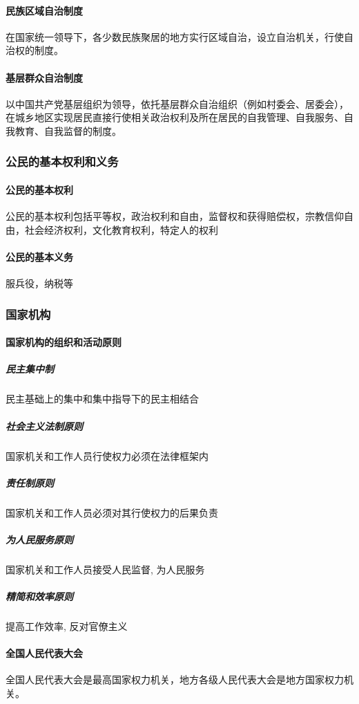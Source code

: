 \paragraph{民族区域自治制度} 在国家统一领导下，各少数民族聚居的地方实行区域自治，设立自治机关，行使自治权的制度。

\paragraph{基层群众自治制度} 以中国共产党基层组织为领导，依托基层群众自治组织（例如村委会、居委会），在城乡地区实现居民直接行使相关政治权利及所在居民的自我管理、自我服务、自我教育、自我监督的制度。

\subsubsection{公民的基本权利和义务}

\paragraph{公民的基本权利} 公民的基本权利包括平等权，政治权利和自由，监督权和获得赔偿权，宗教信仰自由，社会经济权利，文化教育权利，特定人的权利

\paragraph{公民的基本义务} 服兵役，纳税等

\subsubsection{国家机构}

\paragraph{国家机构的组织和活动原则}

\subparagraph{民主集中制} 民主基础上的集中和集中指导下的民主相结合

\subparagraph{社会主义法制原则} 国家机关和工作人员行使权力必须在法律框架内

\subparagraph{责任制原则} 国家机关和工作人员必须对其行使权力的后果负责

\subparagraph{为人民服务原则} 国家机关和工作人员接受人民监督, 为人民服务

\subparagraph{精简和效率原则} 提高工作效率, 反对官僚主义

\paragraph{全国人民代表大会} 全国人民代表大会是最高国家权力机关，地方各级人民代表大会是地方国家权力机关。

